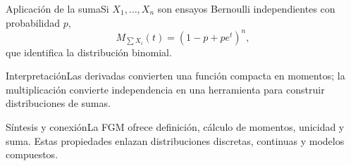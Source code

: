 \documentclass[10pt,aspectratio=169]{beamer}
\begin{document}
\begin{frame}{Aplicación de la suma}\small Si $X_1,\ldots,X_n$ son ensayos Bernoulli independientes con probabilidad $p$,\[M_{\sum X_i}(t)=(1-p+pe^t)^n,\]que identifica la distribución binomial.\end{frame}
\begin{frame}{Interpretación}\small Las derivadas convierten una función compacta en momentos; la multiplicación convierte independencia en una herramienta para construir distribuciones de sumas.\end{frame}
\begin{frame}{Síntesis y conexión}\small La FGM ofrece definición, cálculo de momentos, unicidad y suma. Estas propiedades enlazan distribuciones discretas, continuas y modelos compuestos.\end{frame}
\end{document}
